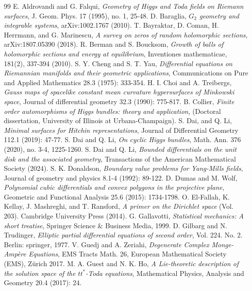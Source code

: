 \documentclass[12pt]{article}
\theoremstyle{definition}
\begin{document}
\begin{thebibliography}{99}
E. Aldrovandi and G. Falqui, {\it Geometry of Higgs and Toda fields on Riemann surfaces}, J. Geom. Phys. 17 (1995), no. 1, 25-48.
 D. Baraglia, {\it $G_2$ geometry and integrable systems}, arXiv:1002.1767 (2010).
 T. Bayraktar, D. Coman, H. Herrmann, and G. Marinescu, {\it A survey on zeros of random holomorphic sections}, arXiv:1807.05390 (2018).
 R. Berman and S. Boucksom, {\it Growth of balls of holomorphic sections and energy at equilibrium}, Inventiones mathematicae, 181(2), 337-394 (2010).
 S. Y. Cheng and S. T. Yau, {\it Differential equations on Riemannian manifolds and their geometric applications}, Communications on Pure and Applied Mathematics 28.3 (1975): 333-354.
 H. I. Choi and A. Treibergs, {\it Gauss maps of spacelike constant mean curvature hypersurfaces of Minkowski space}, Journal of differential geometry 32.3 (1990): 775-817.
 B. Collier, {\it Finite order automorphisms of Higgs bundles: theory and application}, (Doctoral dissertation, University of Illinois at Urbana-Champaign).
 S. Dai, and Q. Li, {\it Minimal surfaces for Hitchin representations}, Journal of Differential Geometry 112.1 (2019): 47-77.
 S. Dai and Q. Li, {\it On cyclic Higgs bundles}, Math. Ann. 376 (2020), no. 3-4, 1225-1260.
 S. Dai and Q. Li, {\it Bounded differentials on the unit disk and the associated geometry}, Transactions of the American Mathematical Society (2024).
 S. K. Donaldson, {\it Boundary value problems for Yang-Mills fields}, Journal of geometry and physics 8.1-4 (1992): 89-122.
 D. Dumas and M. Wolf, {\it Polynomial cubic differentials and convex polygons in the projective plane}, Geometric and Functional Analysis 25.6 (2015): 1734-1798.
 O. El-Fallah, K. Kellay, J. Mashreghi, and T. Ransford, {\it A primer on the Dirichlet space} (Vol. 203). Cambridge University Press (2014).
 G. Gallavotti, {\it Statistical mechanics: A short treatise}, Springer Science \& Business Media, 1999.
 D. Gilbarg and N. Trudinger, {\it Elliptic partial differential equations of second order}, Vol. 224. No. 2. Berlin: springer, 1977.
 V. Guedj and A. Zeriahi, {\it Degenerate Complex Monge-Amp\`ere Equations}, EMS Tracts Math. 26, European Mathematical Society (EMS), Z\"urich 2017.
 M. A. Guest and N. K. Ho, {\it A Lie-theoretic description of the solution space of the $tt^\ast$-Toda equations}, Mathematical Physics, Analysis and Geometry 20.4 (2017): 24.

\end{thebibliography}
\end{document}
